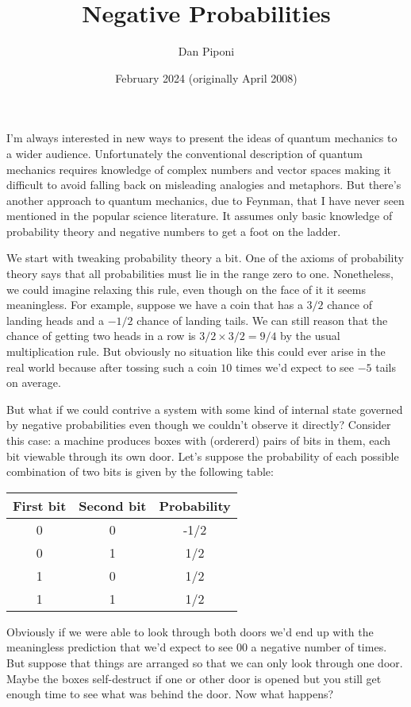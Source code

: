 \documentclass[12pt]{article}
\title{Negative Probabilities}
\author{Dan Piponi}
\date{February 2024 (originally April 2008)}
\begin{document}
\maketitle
I'm always interested in new ways to present the ideas of quantum mechanics to a wider audience. Unfortunately the conventional description of quantum mechanics requires knowledge of complex numbers and vector spaces making it difficult to avoid falling back on misleading analogies and metaphors. But there's another approach to quantum mechanics, due to Feynman, that I have never seen mentioned in the popular science literature. It assumes only basic knowledge of probability theory and negative numbers to get a foot on the ladder.

We start with tweaking probability theory a bit. One of the axioms of probability theory says that all probabilities must lie in the range zero to one. Nonetheless, we could imagine relaxing this rule, even though on the face of it it seems meaningless. For example, suppose we have a coin that has a $3/2$ chance of landing heads and a $-1/2$ chance of landing tails. We can still reason that the chance of getting two heads in a row is $3/2\times 3/2=9/4$ by the usual multiplication rule. But obviously no situation like this could ever arise in the real world because after tossing such a coin $10$ times we'd expect to see $-5$ tails on average.

But what if we could contrive a system with some kind of internal state governed by negative probabilities even though we couldn't observe it directly? Consider this case: a machine produces boxes with (ordererd) pairs of bits in them, each bit viewable through its own door. Let's suppose the probability of each possible combination of two bits is given by the following table:






\begin{center}
\begin{tabular}{|c|c|c|}
	\hline
	First bit &	Second bit &	Probability \\
	\hline
	0 &	0 &	-1/2 \\
	0 &	1 &	1/2 \\
	1 &	0 &	1/2 \\
	1 &	1 &	1/2 \\
	\hline
\end{tabular}
\end{center}

Obviously if we were able to look through both doors we'd end up with the meaningless prediction that we'd expect to see $00$ a negative number of times. But suppose that things are arranged so that we can only look through one door. Maybe the boxes self-destruct if one or other door is opened but you still get enough time to see what was behind the door. Now what happens?
\end{document}
